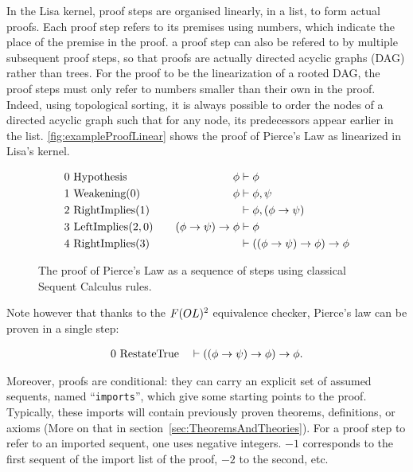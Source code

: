 In the Lisa kernel, proof steps are organised linearly, in a list, to form actual proofs. Each proof step refers to its premises using numbers, which indicate the place of the premise in the proof.
a proof step can also be refered to by multiple subsequent proof steps, so that proofs are actually directed acyclic graphs (DAG) rather than trees. For the proof to be the linearization of a rooted DAG, the proof steps must only refer to numbers smaller than their own in the proof. Indeed, using topological sorting, it is always possible to order the nodes of a directed acyclic graph such that for any node, its predecessors appear earlier in the list.
\autoref{fig:exampleProofLinear} shows the proof of Pierce's Law as linearized in Lisa's kernel.
%
\begin{figure}[ht]
  \begin{align*}
    0 & ~\text{\lstinline|Hypothesis|}       & \quad \phi                     & \vdash \phi                                \\
    1 & ~\text{\lstinline|Weakening|}(0)     & \quad  \phi                    & \vdash \phi, \psi                          \\
    2 & ~\text{\lstinline|RightImplies|}(1)  & \quad                          & \vdash \phi, (\phi \to \psi)               \\
    3 & ~\text{\lstinline|LeftImplies|}(2,0) & \quad (\phi \to \psi) \to \phi & \vdash \phi                                \\
    4 & ~\text{\lstinline|RightImplies|}(3)  & \quad                          & \vdash ((\phi \to \psi) \to \phi) \to \phi
  \end{align*}
  \caption{The proof of Pierce's Law as a sequence of steps using classical Sequent Calculus rules.}
  \label{fig:exampleProofLinear}
\end{figure}

\noindent
Note however that thanks to the $F(OL)\textsuperscript{2}$ equivalence checker, Pierce's law can be proven in a single step:

\begin{gather*}
    0  ~\text{\lstinline|RestateTrue|}        \quad \vdash ((\phi \to \psi) \to \phi) \to \phi .
\end{gather*}

Moreover, proofs are conditional: they can carry an explicit set of assumed sequents, named ``\lstinline|imports|'', which give some starting points to the proof. Typically, these imports will contain previously proven theorems, definitions, or axioms (More on that in section~\ref{sec:TheoremsAndTheories}). For a proof step to refer to an imported sequent, one uses negative integers. $-1$ corresponds to the first sequent of the import list of the proof, $-2$ to the second, etc.


